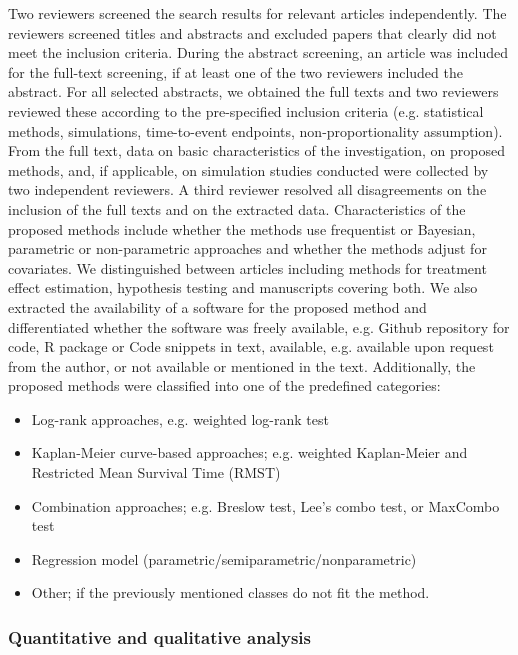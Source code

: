 \noindent Two reviewers screened the search results for relevant articles independently. The reviewers screened titles and abstracts and excluded papers that clearly did not meet the inclusion criteria. During the abstract screening, an article was included for the full-text screening, if at least one of the two reviewers included the abstract. For all selected abstracts, we obtained the full texts and two reviewers reviewed these according to the pre-specified inclusion criteria (e.g. statistical methods, simulations, time-to-event endpoints, non-proportionality assumption). From the full text, data on basic characteristics of the investigation, on proposed methods, and, if applicable, on simulation studies conducted were collected by two independent reviewers. A third reviewer resolved all disagreements on the inclusion of the full texts and on the extracted data. Characteristics of the proposed methods include whether the methods use frequentist or Bayesian, parametric or non-parametric approaches and whether the methods adjust for covariates. We distinguished between articles including methods for treatment effect estimation, hypothesis testing and manuscripts covering both. We also extracted the availability of a software for the proposed method and differentiated whether the software was freely available, e.g. Github repository for code, R package or Code snippets in text, available, e.g. available upon request from the author, or not available or mentioned in the text. 
Additionally, the proposed methods were classified into one of the predefined categories: 
\begin{itemize}
    \item Log-rank approaches, e.g. weighted log-rank test
    \item Kaplan-Meier curve-based approaches; e.g. weighted Kaplan-Meier and Restricted Mean Survival Time (RMST)
    \item Combination approaches; e.g. Breslow test, Lee’s combo test, or MaxCombo test
    \item Regression model (parametric/semiparametric/nonparametric)
    \item Other; if the previously mentioned classes do not fit the method.
\end{itemize}


\subsubsection{Quantitative and qualitative analysis}

